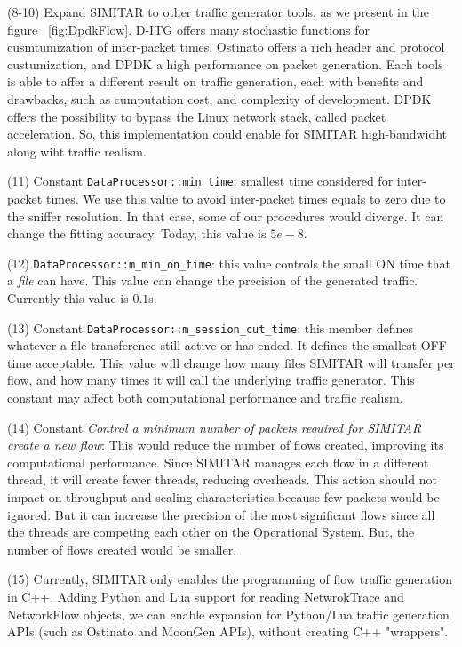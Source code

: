 (8-10) Expand SIMITAR to other traffic generator tools, as we present in the figure ~\ref{fig:DpdkFlow}. D-ITG offers many stochastic functions for cusmtumization of inter-packet times, Ostinato offers a rich header and protocol custumization, and DPDK a high performance on packet generation. Each tools is able to affer a different result on traffic generation, each with benefits and drawbacks, such as cumputation cost, and complexity of development. DPDK offers the possibility to bypass the Linux network stack, called packet acceleration. So, this implementation could enable for SIMITAR high-bandwidht along wiht traffic realism.

(11) Constant \texttt{DataProcessor::min\_time}: smallest time considered for inter-packet times. We use this value to avoid inter-packet times equals to zero due to the sniffer resolution. In that case, some of our procedures would diverge. It can change the fitting accuracy. Today, this value is $5e-8$.


(12) \texttt{DataProcessor::m\_min\_on\_time}: this value controls the small ON time that a \textit{file} can have. This value  can change the precision of the generated traffic. Currently this value is $0.1$s. 


(13) Constant \texttt{DataProcessor::m\_session\_cut\_time}: this member defines whatever a file transference still active or has ended. It defines the smallest OFF time acceptable. This value will change how many files SIMITAR will transfer per flow, and how many times it will call the underlying traffic generator. This constant may affect both computational performance and traffic realism.


(14) Constant \textit{Control a minimum number of packets required for SIMITAR create a new flow}: This would reduce the number of flows created, improving its computational performance. Since SIMITAR manages each flow in a  different thread, it will create fewer threads, reducing overheads. This action should not impact  on throughput and scaling characteristics because few packets would be ignored. But it can increase the precision of the most significant flows since all the threads are competing each other on the Operational System. But, the number of flows created would be smaller.


(15) Currently, SIMITAR only enables the programming of flow traffic generation in C++. Adding Python and Lua support for reading NetwrokTrace and NetworkFlow objects, we can enable expansion for Python/Lua traffic generation APIs (such as Ostinato and MoonGen APIs), without creating C++ "wrappers".


